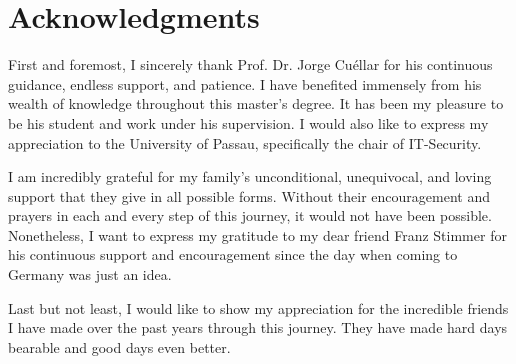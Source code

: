 \chapter*{Acknowledgments}

First and foremost, I sincerely thank Prof. Dr. Jorge Cu\'{e}llar for his continuous guidance, endless support, and patience. I have benefited immensely from his wealth of knowledge throughout this master's degree. It has been my pleasure to be his student and work under his supervision. I would also like to express my appreciation to the University of Passau, specifically the chair of IT-Security.

I am incredibly grateful for my family's unconditional, unequivocal, and loving support that they give in all possible forms. Without their encouragement and prayers in each and every step of this journey, it would not have been possible. Nonetheless, I want to express my gratitude to my dear friend Franz Stimmer for his continuous support and encouragement since the day when coming to Germany was just an idea.

Last but not least, I would like to show my appreciation for the incredible friends I have made over the past years through this journey. They have made hard days bearable and good days even better.

